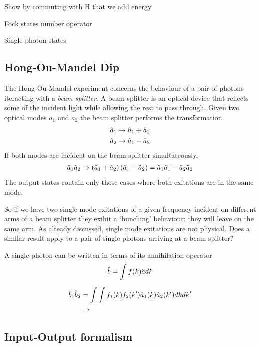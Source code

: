 Show by commuting with H that we add energy

Fock states number operator

Single photon states

\subsection{Hong-Ou-Mandel Dip}

The Hong-Ou-Mandel experiment concerns the behaviour of a pair of photons iteracting with a \textit{beam splitter}. A beam splitter is an optical device that reflects some of the incident light while allowing the rest to pass through. Given two optical modes $a_1$ and $a_2$ the beam splitter performs the transformation
\begin{align}
  \hat{a}_{1} \rightarrow \hat{a}_{1} + \hat{a}_{2} \\
  \hat{a}_{2} \rightarrow \hat{a}_{1} - \hat{a}_{2}
\end{align}
If both modes are incident on the beam splitter simultateously,
\begin{align}
  \hat{a}_{1}\hat{a}_{2} \rightarrow \left(\hat{a}_{1} + \hat{a}_{2}\right) \left(\hat{a}_{1} - \hat{a}_{2}\right) = \hat{a}_{1}\hat{a}_{1} - \hat{a}_{2}\hat{a}_{2}
\end{align}
The output states contain only those cases where both exitations are in the same mode.

So if we have two single mode exitations of a given frequency incident on different arms of a beam splitter they exihit a `bunching' behaviour: they will leave on the same arm. As already discussed, single mode exitations are not physical. Does a similar result apply to a pair of single photons arriving at a beam splitter?

A single photon can be written in terms of its annihilation operator
\begin{align}
  \hat{b} = \int f(k) \hat{a} dk
\end{align}

\begin{align}
  \hat{b}_1 \hat{b}_2 & = \int \int f_1(k)f_2(k') \hat{a}_1(k) \hat{a}_2(k') dkdk' \\
                    & \rightarrow
\end{align}

\subsection{Input-Output formalism}



